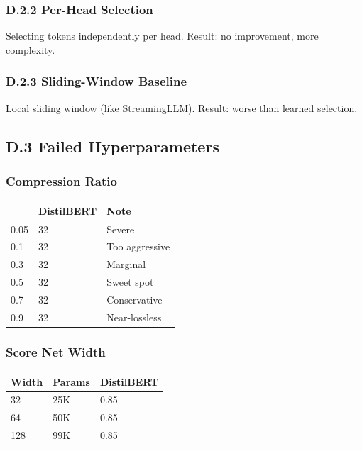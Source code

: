 \subsubsection{D.2.2 Per-Head Selection}

Selecting tokens independently per head. Result: no improvement, more 
complexity.

\subsubsection{D.2.3 Sliding-Window Baseline}

Local sliding window (like StreamingLLM). Result: worse than learned selection.

\subsection{D.3 Failed Hyperparameters}

\subsubsection{Compression Ratio}

\begin{table}[H]
\centering
\small
\begin{tabular}{lll}
\toprule
\textbf{} & \textbf{DistilBERT} & \textbf{Note} \\
\midrule
0.05 & 32 & Severe \\
0.1 & 32 & Too aggressive \\
0.3 & 32 & Marginal \\
0.5 & 32 & Sweet spot \\
0.7 & 32 & Conservative \\
0.9 & 32 & Near-lossless \\
\bottomrule
\end{tabular}
\end{table}

\subsubsection{Score Net Width}

\begin{table}[H]
\centering
\small
\begin{tabular}{lll}
\toprule
\textbf{Width} & \textbf{Params} & \textbf{DistilBERT} \\
\midrule
32 & 25K & 0.85 \\
64 & 50K & 0.85 \\
128 & 99K & 0.85 \\
\bottomrule
\end{tabular}
\end{table}

